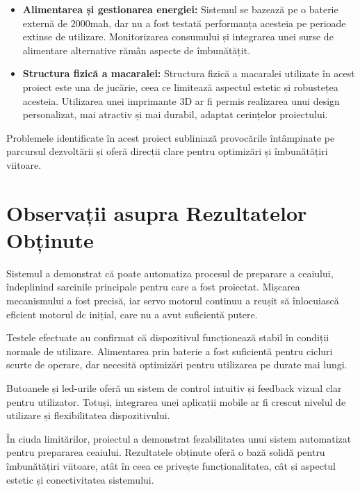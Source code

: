 \begin{itemize}
        \item \textbf{Alimentarea și gestionarea energiei:} %
        Sistemul se bazează pe o baterie %
        externă de 2000\gls{mah}, dar nu a fost %
        testată performanța acesteia pe %
        perioade extinse de utilizare. %
        Monitorizarea consumului și integrarea %
        unei surse de alimentare alternative %
        rămân aspecte de îmbunătățit.  

        \item \textbf{Structura fizică a macaralei:} %
        Structura fizică a macaralei utilizate în acest %
        proiect este una de jucărie, ceea ce limitează aspectul %
        estetic și robustețea acesteia. Utilizarea unei imprimante %
        3D ar fi permis realizarea unui design personalizat, %
        mai atractiv și mai durabil, adaptat cerințelor proiectului.
    \end{itemize}
    
    \bigskip
    
    Problemele identificate în acest proiect %
    subliniază provocările întâmpinate pe parcursul %
    dezvoltării și oferă direcții clare pentru %
    optimizări și îmbunătățiri viitoare.


    

\section{Observații asupra Rezultatelor Obținute}

    Sistemul a demonstrat că poate automatiza %
    procesul de preparare a ceaiului, îndeplinind %
    sarcinile principale pentru care a fost %
    proiectat. Mișcarea mecanismului a fost precisă, %
    iar servo motorul continuu a reușit să %
    înlocuiască eficient motorul \gls{dc} inițial, %
    care nu a avut suficientă putere.  
    
    Testele efectuate au confirmat că dispozitivul %
    funcționează stabil în condiții normale de %
    utilizare. Alimentarea prin baterie a fost %
    suficientă pentru cicluri scurte de operare, %
    dar necesită optimizări pentru utilizarea %
    pe durate mai lungi.  
    
    Butoanele și \gls{led}-urile oferă un sistem de %
    control intuitiv și feedback vizual clar %
    pentru utilizator. Totuși, integrarea unei %
    aplicații mobile ar fi crescut nivelul de %
    utilizare și flexibilitatea dispozitivului.  
    
    În ciuda limitărilor, proiectul a demonstrat %
    fezabilitatea unui sistem automatizat pentru %
    prepararea ceaiului. Rezultatele obținute oferă %
    o bază solidă pentru îmbunătățiri viitoare, %
    atât în ceea ce privește funcționalitatea, %
    cât și aspectul estetic și conectivitatea %
    sistemului.
    




